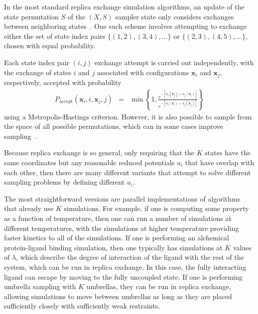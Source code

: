 \documentclass[9pt,review]{livecoms}
\newcommand{\vx}{\mathbf{x}}
\begin{document}
In the most standard replica exchange simulation algorithms, an update of the state permutation $S$ of the $(X,S)$ sampler state only considers exchanges between neighboring states~\cite{hukushima-nemoto:j-phys-soc-jpn:1996:parallel-tempering,hansmann:chem-phys-lett:1997:parallel-tempering-monte-carlo,sugita-okamoto:chem-phys-lett:1999:parallel-tempering-md,sugita-kitao-okamoto:jcp:2000:hamiltonian-exchange,fukunishi-watanabe-takada:jcp:2002:hamiltonian-exchange,jang-shin-pak:prl:2003:hamiltonian-exchange,kwak-hansmann:prl:2005:hamiltonian-exchange}.
One such scheme involves attempting to exchange either the set of state index pairs $\{(1,2), (3,4), \ldots\}$ or $\{(2,3), (4,5), \ldots\}$, chosen with equal probability.


Each state index pair $(i,j)$ exchange attempt is carried out independently, with the exchange of states $i$ and $j$ associated with configurations $\vx_i$ and $\vx_j$, respectively, accepted with probability
\begin{eqnarray}
\label{eq:re_exchange_prob}
P_\mathrm{accept}(\vx_i, i, \vx_j, j) &=& \min\left\{ 1, \frac{e^{-[u_i(\vx_j)+u_j(\vx_i)]}}{e^{-[u_i(\vx_i) + u_j(\vx_j)]}}\right\}
\label{eq:metropolis-replica}
\end{eqnarray}
using a Metropolis-Hastings criterion.
However, it is also possible to sample from the space of all possible permutations, which can in some cases improve sampling~\cite{shirts_gibbssamp}.

Because replica exchange is so general, only requiring that the $K$ states have the same coordinates but any reasonable reduced potentials $u_i$ that have overlap with each other, then there are many different variants that attempt to solve different sampling problems by defining different $u_i$.

The most straightforward versions are parallel implementations of algorithms that already use $K$ simulations. For example, if one is computing some property as a function of temperature, then one can run a number of simulations at different temperatures, with the simulations at higher temperature providing faster kinetics to all of the simulations. If one is performing an alchemical protein-ligand binding simulation, then one typically has simulations at $K$ values of $\lambda$, which describe the degree of interaction of the ligand with the rest of the system, which can be run in replica exchange. In this case, the fully interacting ligand can escape by moving to the fully uncoupled state. If one is performing umbrella sampling with $K$ umbrellas, they can be run in replica exchange, allowing simulations to move between umbrellas as long as they are placed sufficiently closely with sufficiently weak restraints.
\end{document}
